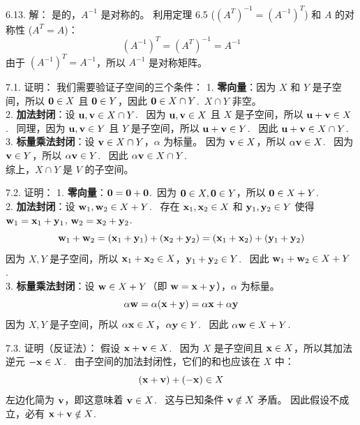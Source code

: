 \begin{exer}
6.13. 解：
是的，$A^{-1}$ 是对称的。
利用定理 6.5 ($(A^T)^{-1} = (A^{-1})^T$) 和 $A$ 的对称性 ($A^T = A$)：
$$ (A^{-1})^T = (A^T)^{-1} = A^{-1} $$
由于 $(A^{-1})^T = A^{-1}$，所以 $A^{-1}$ 是对称矩阵。



\vspace{5ex}


7.1. 证明：
我们需要验证子空间的三个条件：
1. \textbf{零向量}：因为 $X$ 和 $Y$ 是子空间，所以 $\mathbf{0} \in X$ 且 $\mathbf{0} \in Y$，因此 $\mathbf{0} \in X \cap Y$.~$X \cap Y$ 非空。\\
2. \textbf{加法封闭}：设 $\mathbf{u}, \mathbf{v} \in X \cap Y$.~
   因为 $\mathbf{u}, \mathbf{v} \in X$ 且 $X$ 是子空间，所以 $\mathbf{u} + \mathbf{v} \in X$.~
   同理，因为 $\mathbf{u}, \mathbf{v} \in Y$ 且 $Y$ 是子空间，所以 $\mathbf{u} + \mathbf{v} \in Y$.~
   因此 $\mathbf{u} + \mathbf{v} \in X \cap Y$.~\\
3. \textbf{标量乘法封闭}：设 $\mathbf{v} \in X \cap Y$，$\alpha$ 为标量。
   因为 $\mathbf{v} \in X$，所以 $\alpha \mathbf{v} \in X$.~
   因为 $\mathbf{v} \in Y$，所以 $\alpha \mathbf{v} \in Y$.~
   因此 $\alpha \mathbf{v} \in X \cap Y$.~\\
综上，$X \cap Y$ 是 $V$ 的子空间。

7.2. 证明：
1. \textbf{零向量}：$\mathbf{0} = \mathbf{0} + \mathbf{0}$.~因为 $\mathbf{0} \in X, \mathbf{0} \in Y$，所以 $\mathbf{0} \in X+Y$.~\\
2. \textbf{加法封闭}：设 $\mathbf{w}_1, \mathbf{w}_2 \in X+Y$.~
   存在 $\mathbf{x}_1, \mathbf{x}_2 \in X$ 和 $\mathbf{y}_1, \mathbf{y}_2 \in Y$ 使得 $\mathbf{w}_1 = \mathbf{x}_1 + \mathbf{y}_1$, $\mathbf{w}_2 = \mathbf{x}_2 + \mathbf{y}_2$.~
   $$ \mathbf{w}_1 + \mathbf{w}_2 = (\mathbf{x}_1 + \mathbf{y}_1) + (\mathbf{x}_2 + \mathbf{y}_2) = (\mathbf{x}_1 + \mathbf{x}_2) + (\mathbf{y}_1 + \mathbf{y}_2) $$
   因为 $X, Y$ 是子空间，所以 $\mathbf{x}_1+\mathbf{x}_2 \in X$，$\mathbf{y}_1+\mathbf{y}_2 \in Y$.~
   因此 $\mathbf{w}_1 + \mathbf{w}_2 \in X+Y$.~\\
3. \textbf{标量乘法封闭}：设 $\mathbf{w} \in X+Y$（即 $\mathbf{w} = \mathbf{x} + \mathbf{y}$），$\alpha$ 为标量。
   $$ \alpha \mathbf{w} = \alpha(\mathbf{x} + \mathbf{y}) = \alpha \mathbf{x} + \alpha \mathbf{y} $$
   因为 $X, Y$ 是子空间，所以 $\alpha \mathbf{x} \in X$，$\alpha \mathbf{y} \in Y$.~
   因此 $\alpha \mathbf{w} \in X+Y$.~

7.3. 证明（反证法）：
假设 $\mathbf{x} + \mathbf{v} \in X$.~
因为 $X$ 是子空间且 $\mathbf{x} \in X$，所以其加法逆元 $-\mathbf{x} \in X$.~
由子空间的加法封闭性，它们的和也应该在 $X$ 中：
$$ (\mathbf{x} + \mathbf{v}) + (-\mathbf{x}) \in X $$
左边化简为 $\mathbf{v}$，即这意味着 $\mathbf{v} \in X$.~
这与已知条件 $\mathbf{v} \notin X$ 矛盾。
因此假设不成立，必有 $\mathbf{x} + \mathbf{v} \notin X$.~


\end{exer}

